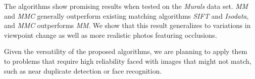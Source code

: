 \documentclass{article}
\begin{document}
The algorithms show promising results when tested on the \emph{Murals} data 
set. %
\emph{MM} and \emph{MMC} 
generally outperform existing matching algorithms \emph{SIFT} and \emph{Isodata}, and \emph{MMC} 
outperforms \emph{MM}. We show that this result generalizes to 
variations in viewpoint change as well as more realistic photos featuring occlusions. 

Given the versatility of the proposed algorithms, we are planning to apply them to problems that require high 
reliability faced with images that might not match, such as near 
duplicate detection or face recognition.
%



\end{document}
